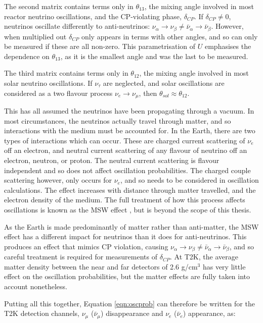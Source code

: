 The second matrix contains terms only in $\theta_{13}$, the mixing angle involved in most reactor neutrino oscillations, and the CP-violating phase, $\delta_{CP}$. If $\delta_{CP} \neq 0$, neutrinos oscillate differently to anti-neutrinos: $\nu_{\alpha} \rightarrow \nu_{\beta} \neq \bar{\nu}_{\alpha} \rightarrow \bar{\nu}_{\beta}$. However, when multiplied out $\delta_{CP}$ only appears in terms with other angles, and so can only be measured if these are all non-zero. This parametrisation of $U$ emphasises the dependence on $\theta_{13}$, as it is the smallest angle and was the last to be measured.

The third matrix contains terms only in $\theta_{12}$, the mixing angle involved in most solar neutrino oscillations. If $\nu_\tau$ are neglected, and solar oscillations are considered as a two flavour process $\nu_{e} \rightarrow \nu_{\mu}$, then $\theta_{sol} \approx \theta_{12}$.

This has all assumed the neutrinos have been propagating through a vacuum. In most circumstances, the neutrinos actually travel through matter, and so interactions with the medium must be accounted for. In the Earth, there are two types of interactions which can occur. These are charged current scattering of $\nu_{e}$ off an electron, and neutral current scattering of any flavour of neutrino off an electron, neutron, or proton. The neutral current scattering is flavour independent and so does not affect oscillation probabilities. The charged couple scattering however, only occurs for $\nu_{e}$, and so needs to be considered in oscillation calculations. The effect increases with distance through matter travelled, and the electron density of the medium. The full treatment of how this process affects oscillations is known as the MSW effect \cite{msw}, but is beyond the scope of this thesis.

As the Earth is made predominantly of matter rather than anti-matter, the MSW effect has a different impact for neutrinos than it does for anti-neutrinos. This produces an effect that mimics CP violation, causing $\nu_{\alpha} \rightarrow \nu_{\beta} \neq \bar{\nu}_{\alpha} \rightarrow \bar{\nu}_{\beta}$, and so careful treatment is required for measurements of $\delta_{CP}$. At T2K, the average matter density between the near and far detectors of 2.6 g/cm$^3$ \cite{massdensity} has very little effect on the oscillation probabilities, but the matter effects are fully taken into account nonetheless.

Putting all this together, Equation \eqref{eqn:oscprob} can therefore be written for the T2K detection channels, $\nu_\mu$ ($\bar{\nu}_{\mu}$) disappearance and $\nu_e$ ($\bar{\nu}_e$) appearance, as:

